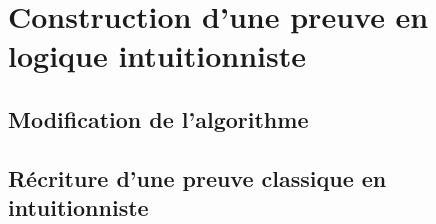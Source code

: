 \section{Construction d'une preuve en logique intuitionniste}

\subsection{Modification de l'algorithme}

\subsection{R\'ecriture d'une preuve classique en intuitionniste}
